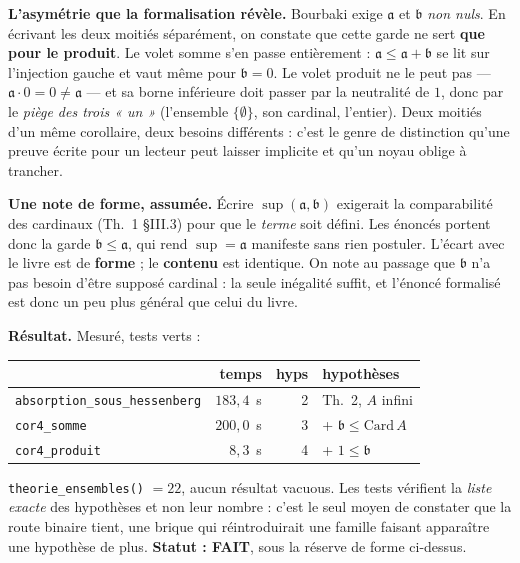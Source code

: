 \textbf{L'asymétrie que la formalisation révèle.} Bourbaki exige $\mathfrak{a}$
et $\mathfrak{b}$ \emph{non nuls}. En écrivant les deux moitiés séparément, on
constate que cette garde ne sert \textbf{que pour le produit}. Le volet somme
s'en passe entièrement : $\mathfrak{a} \le \mathfrak{a}+\mathfrak{b}$ se lit sur
l'injection gauche et vaut même pour $\mathfrak{b} = 0$. Le volet produit ne le
peut pas --- $\mathfrak{a}\cdot 0 = 0 \ne \mathfrak{a}$ --- et sa borne
inférieure doit passer par la neutralité de $1$, donc par le \emph{piège des
trois « un »} (l'ensemble $\{\emptyset\}$, son cardinal, l'entier). Deux moitiés
d'un même corollaire, deux besoins différents : c'est le genre de distinction
qu'une preuve écrite pour un lecteur peut laisser implicite et qu'un noyau
oblige à trancher.

\textbf{Une note de forme, assumée.} Écrire $\sup(\mathfrak{a},\mathfrak{b})$
exigerait la comparabilité des cardinaux (Th.~1 §III.3) pour que le \emph{terme}
soit défini. Les énoncés portent donc la garde $\mathfrak{b} \le \mathfrak{a}$,
qui rend $\sup = \mathfrak{a}$ manifeste sans rien postuler. L'écart avec le
livre est de \textbf{forme} ; le \textbf{contenu} est identique. On note au
passage que $\mathfrak{b}$ n'a pas besoin d'être supposé cardinal : la seule
inégalité suffit, et l'énoncé formalisé est donc un peu plus général que celui
du livre.

\textbf{Résultat.} Mesuré, tests verts :
\begin{center}
\small
\begin{tabular}{@{}lrrl@{}}
\toprule
& temps & hyps & hypothèses \\
\midrule
\texttt{absorption\_sous\_hessenberg} & $183{,}4$~s & 2 & Th.~2, $A$ infini \\
\texttt{cor4\_somme} & $200{,}0$~s & 3 & + $\mathfrak{b} \le \mathrm{Card}\,A$ \\
\texttt{cor4\_produit} & $8{,}3$~s & 4 & + $1 \le \mathfrak{b}$ \\
\bottomrule
\end{tabular}
\end{center}
\texttt{theorie\_ensembles()} $= 22$, aucun résultat vacuous. Les tests vérifient
la \emph{liste exacte} des hypothèses et non leur nombre : c'est le seul moyen de
constater que la route binaire tient, une brique qui réintroduirait une famille
faisant apparaître une hypothèse de plus. \textbf{Statut : FAIT}, sous la réserve
de forme ci-dessus.
